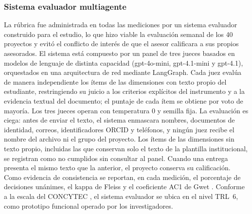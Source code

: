 \documentclass[journal]{IEEEtran}
\begin{document}
\subsubsection{Sistema evaluador multiagente}
La rúbrica fue administrada en todas las mediciones por un sistema evaluador construido para el estudio, lo que hizo viable la evaluación semanal de los 40 proyectos y evitó el conflicto de interés de que el asesor calificara a sus propios asesorados. El sistema está compuesto por un panel de tres jueces basados en modelos de lenguaje de distinta capacidad (gpt-4o-mini, gpt-4.1-mini y gpt-4.1), orquestados en una arquitectura de red mediante LangGraph. Cada juez evalúa de manera independiente los ítems de las dimensiones con texto propio del estudiante, restringiendo su juicio a los criterios explícitos del instrumento y a la evidencia textual del documento; el puntaje de cada ítem se obtiene por voto de mayoría. Los tres jueces operan con temperatura 0 y semilla fija. La evaluación es ciega: antes de enviar el texto, el sistema enmascara nombres, documentos de identidad, correos, identificadores ORCID y teléfonos, y ningún juez recibe el nombre del archivo ni el grupo del proyecto. Los ítems de las dimensiones sin texto propio, incluidas las que conservan solo el texto de la plantilla institucional, se registran como no cumplidos sin consultar al panel. Cuando una entrega presenta el mismo texto que la anterior, el proyecto conserva su calificación. Como evidencia de consistencia se reportan, en cada medición, el porcentaje de decisiones unánimes, el kappa de Fleiss \cite{fleiss1971} y el coeficiente AC1 de Gwet \cite{gwet2008}. Conforme a la escala del CONCYTEC \cite{concytec2022}, el sistema evaluador se ubica en el nivel TRL~6, como prototipo funcional operado por los investigadores.
\end{document}
